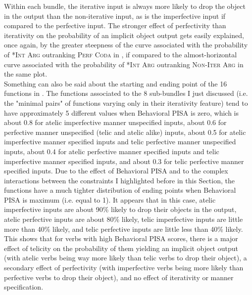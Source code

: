 Within each bundle, the iterative input is always more likely to drop the object in the output than the non-iterative input, as is the imperfective input if compared to the perfective input. The stronger effect of perfectivity than iterativity on the probability of an implicit object output gets easily explained, once again, by the greater steepness of the curve associated with the probability of \textsc{*Int Arg} outranking \textsc{Perf Coda} in , if compared to the almost-horizontal curve associated with the probability of \textsc{*Int Arg} outranking \textsc{Non-Iter Arg} in the same plot.\\
Something can also be said about the starting and ending point of the 16 functions in . The functions associated to the 8 sub-bundles I just discussed (i.e. the "minimal pairs" of functions varying only in their iterativity feature) tend to have approximately 5 different values when Behavioral PISA is zero, which is about 0.8 for atelic imperfective manner unspecified inputs, about 0.6 for perfective manner unspecified (telic and atelic alike) inputs, about 0.5 for atelic imperfective manner specified inputs and telic perfective manner unspecified inputs, about 0.4 for atelic perfective manner specified inputs and telic imperfective manner specified inputs, and about 0.3 for telic perfective manner specified inputs. Due to the effect of Behavioral PISA and to the complex interactions between the constraints I highlighted before in this Section, the functions have a much tighter distribution of ending points when Behavioral PISA is maximum (i.e. equal to 1). It appears that in this case, atelic imperfective inputs are about 90\% likely to drop their objects in the output, atelic perfective inputs are about 80\% likely, telic imperfective inputs are little more than 40\% likely, and telic perfective inputs are little less than 40\% likely. This shows that for verbs with high Behavioral PISA scores, there is a major effect of telicity on the probability of them yielding an implicit object output (with atelic verbs being way more likely than telic verbs to drop their object), a secondary effect of perfectivity (with imperfective verbs being more likely than perfective verbs to drop their object), and no effect of iterativity or manner specification.\\
